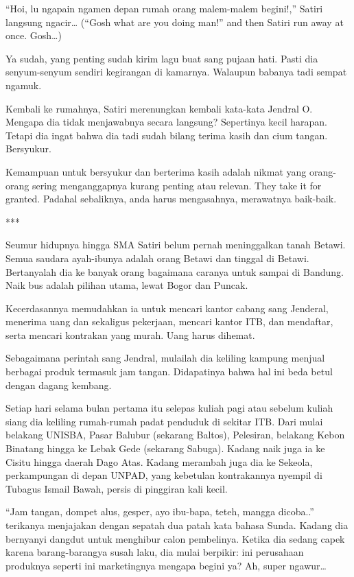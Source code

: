 “Hoi, lu ngapain ngamen depan rumah orang malem-malem begini!,” Satiri langsung ngacir… (“Gosh what are you doing man!” and then Satiri run away at once. Gosh…)

Ya sudah, yang penting sudah kirim lagu buat sang pujaan hati. Pasti dia senyum-senyum sendiri kegirangan di kamarnya. Walaupun babanya tadi sempat ngamuk.

Kembali ke rumahnya, Satiri merenungkan kembali kata-kata Jendral O. Mengapa dia tidak menjawabnya secara langsung? Sepertinya kecil harapan. Tetapi dia ingat bahwa dia tadi sudah bilang terima kasih dan cium tangan. Bersyukur.

Kemampuan untuk bersyukur dan berterima kasih adalah nikmat yang orang-orang sering menganggapnya kurang penting atau relevan. They take it for granted. Padahal sebaliknya, anda harus mengasahnya, merawatnya baik-baik.

***

Seumur hidupnya hingga SMA Satiri belum pernah meninggalkan tanah Betawi. Semua saudara ayah-ibunya adalah orang Betawi dan tinggal di Betawi. Bertanyalah dia ke banyak orang bagaimana caranya untuk sampai di Bandung. Naik bus adalah pilihan utama, lewat Bogor dan Puncak.

Kecerdasannya memudahkan ia untuk mencari kantor cabang sang Jenderal, menerima uang dan sekaligus pekerjaan, mencari kantor ITB, dan mendaftar, serta mencari kontrakan yang murah. Uang harus dihemat.

Sebagaimana perintah sang Jendral, mulailah dia keliling kampung menjual berbagai produk termasuk jam tangan. Didapatinya bahwa hal ini beda betul dengan dagang kembang.

Setiap hari selama bulan pertama itu selepas kuliah pagi atau sebelum kuliah siang dia keliling rumah-rumah padat penduduk di sekitar ITB. Dari mulai belakang UNISBA, Pasar Balubur (sekarang Baltos), Pelesiran, belakang Kebon Binatang hingga ke Lebak Gede (sekarang Sabuga). Kadang naik juga ia ke Cisitu hingga daerah Dago Atas. Kadang merambah juga dia ke Sekeola, perkampungan di depan UNPAD, yang kebetulan kontrakannya nyempil di Tubagus Ismail Bawah, persis di pinggiran kali kecil.

“Jam tangan, dompet alus, gesper, ayo ibu-bapa, teteh, mangga dicoba..” terikanya menjajakan dengan sepatah dua patah kata bahasa Sunda. Kadang dia bernyanyi dangdut untuk menghibur calon pembelinya. Ketika dia sedang capek karena barang-barangya susah laku, dia mulai berpikir: ini perusahaan produknya seperti ini marketingnya mengapa begini ya? Ah, super ngawur…

